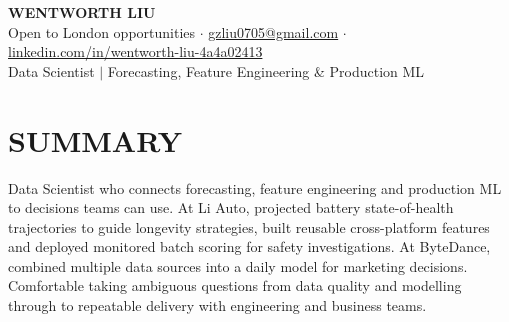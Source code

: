 \documentclass[a4paper,10pt]{article}
\begin{document}
\fontsize{9.8pt}{11.2pt}\selectfont

\begin{center}
{\Large\bfseries WENTWORTH LIU}\\[2pt]
{\small Open to London opportunities \;$\cdot$\; \href{mailto:gzliu0705@gmail.com}{gzliu0705@gmail.com} \;$\cdot$\; \href{https://www.linkedin.com/in/wentworth-liu-4a4a02413}{linkedin.com/in/wentworth-liu-4a4a02413}}\\[2pt]
 {\small Data Scientist \;$\vert$\; Forecasting, Feature Engineering \& Production ML}
\end{center}
\vspace{-4pt}

\section{SUMMARY}
Data Scientist who connects forecasting, feature engineering and production ML to decisions teams can use. At Li Auto, projected battery state-of-health trajectories to guide longevity strategies, built reusable cross-platform features and deployed monitored batch scoring for safety investigations. At ByteDance, combined multiple data sources into a daily model for marketing decisions. Comfortable taking ambiguous questions from data quality and modelling through to repeatable delivery with engineering and business teams.
\end{document}
